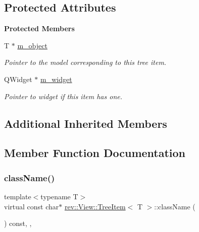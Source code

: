 \subsection*{Protected Attributes}
\begin{Indent}\textbf{ Protected Members}\par
\begin{DoxyCompactItemize}
\item 
\mbox{\label{classrev_1_1_view_1_1_tree_item_a99e571e6cd35b792383dba959e036081}} 
T $\ast$ \mbox{\hyperlink{classrev_1_1_view_1_1_tree_item_a99e571e6cd35b792383dba959e036081}{m\+\_\+object}}
\begin{DoxyCompactList}\small\item\em Pointer to the model corresponding to this tree item. \end{DoxyCompactList}\item 
\mbox{\label{classrev_1_1_view_1_1_tree_item_ac9dcba5f1de7bc74e81d193214ef7194}} 
Q\+Widget $\ast$ \mbox{\hyperlink{classrev_1_1_view_1_1_tree_item_ac9dcba5f1de7bc74e81d193214ef7194}{m\+\_\+widget}}
\begin{DoxyCompactList}\small\item\em Pointer to widget if this item has one. \end{DoxyCompactList}\end{DoxyCompactItemize}
\end{Indent}
\subsection*{Additional Inherited Members}


\subsection{Member Function Documentation}
\mbox{\label{classrev_1_1_view_1_1_tree_item_a8a12a6ceece6cab7a2299da2b5e6a54b}} 
\subsubsection{\texorpdfstring{className()}{className()}}
{\footnotesize\ttfamily template$<$typename T$>$ \\
virtual const char$\ast$ \mbox{\hyperlink{classrev_1_1_view_1_1_tree_item}{rev\+::\+View\+::\+Tree\+Item}}$<$ T $>$\+::class\+Name (\begin{DoxyParamCaption}{ }\end{DoxyParamCaption}) const\hspace{0.3cm}{\ttfamily [inline]}, {\ttfamily [override]}, {\ttfamily [virtual]}}



